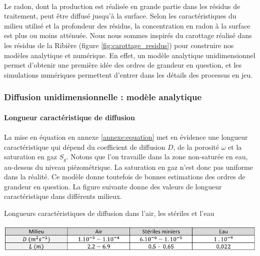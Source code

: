 \documentclass{article}
\begin{document}
\paragraph{} Le radon, dont la production est réalisée en grande partie dans les résidus de traitement, peut être diffusé jusqu’à la surface. Selon les caractéristiques du milieu utilisé et la profondeur des résidus, la concentration en radon à la surface est plus ou moins atténuée. Nous nous sommes inspirés du carottage réalisé dans les résidus de la Ribière (figure \ref{fig:carottage_residus}) pour construire nos modèles analytique et numérique. En effet, un modèle analytique unidimensionnel permet d’obtenir une première idée des ordres de grandeur en question, et les simulations numériques permettent d'entrer dans les détails des processus en jeu.

\subsubsection{Diffusion unidimensionnelle : modèle analytique}

\paragraph{Longueur caractéristique de diffusion}

\paragraph{} La mise en équation en annexe \ref{annexe:equation} met en évidence une longueur caractéristique qui dépend du coefficient de diffusion $D$, de la porosité $\omega$ et la saturation en gaz $S_g$. Notons que l’on travaille dans la zone non-saturée en eau, au-dessus du niveau piézométrique. La saturation en gaz n’est donc pas uniforme dans la réalité. Ce modèle donne toutefois de bonnes estimations des ordres de grandeur en question. La figure suivante donne des valeurs de longueur caractéristique dans différents milieux.

\begin{table}[H]
    \centering
    \caption{Longueurs caractéristiques de diffusion dans l'air, les stériles et l'eau}
    \includegraphics[width = \linewidth]{III_C_2.png}

    \label{tab:longueur_diffusion}
\end{table}
\end{document}
